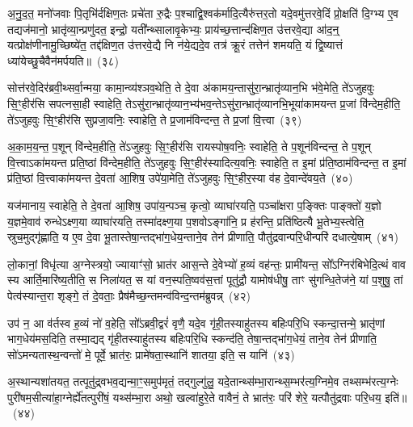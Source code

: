 अ॒नु॒द॒त॒ मनो॑जवाः पि॒तृभि॑र्दक्षिण॒तः प्रचे॑ता रु॒द्रैः प॒श्चाद्वि॒श्वक॑र्मादि॒त्यैरु॑त्तर॒तो यदे॒वमु॑त्तरवे॒दिं प्रो॒क्षति॑ दि॒ग्भ्य ए॒व तद्यज॑मानो॒ भ्रातृ॑व्या॒न्प्रणु॑दत॒ इन्द्रो॒ यती᳚न्थ्सालावृ॒केभ्यः॒ प्राय॑च्छ॒त्तान्द॑क्षिण॒त उ॑त्तरवे॒द्या आ॑द॒न्॒ यत्प्रोक्ष॑णीनामु॒च्छिष्ये॑त॒ तद्द॑क्षिण॒त उ॑त्तरवे॒द्यै नि न॑ये॒द्यदे॒व तत्र॑ क्रू॒रं तत्तेन॑ शमयति॒ यं द्वि॒ष्यात्तं ध्या॑येच्छु॒चैवैन॑मर्पयति॥~(३८)\ip

{\anuvakamend[{मि॒मी॒ते॒ नाम॑ ध्रु॒वा\-ऽप॑ शु॒चा त्रीणि॑ च}]}

सोत्त॑रवे॒दिर॑ब्रवी॒थ्सर्वा॒न्मया॒ कामा॒न्व्य॑श्ञव॒थेति॒ ते दे॒वा अ॑कामय॒न्तासु॑रा॒न्भ्रातृ॑व्यान॒भि भ॑वे॒मेति॒ ते॑\-ऽजुहवुः सि॒ꣳ॒हीर॑सि सपत्नसा॒ही स्वाहेति॒ ते\-ऽसु॑रा॒न्भ्रातृ॑व्यान॒भ्य॑भव॒न्ते\-ऽसु॑रा॒न्भ्रातृ॑व्यानभि॒भूया॑कामयन्त प्र॒जां वि॑न्देम॒हीति॒ ते॑\-ऽजुहवुः सि॒ꣳ॒हीर॑सि सुप्रजा॒वनिः॒ स्वाहेति॒ ते प्र॒जाम॑विन्दन्त॒ ते प्र॒जां वि॒त्त्वा~(३९)\ip

अ॒का॒म॒य॒न्त॒ प॒शून् वि॑न्देम॒हीति॒ ते॑\-ऽजुहवुः सि॒ꣳ॒हीर॑सि रायस्पोष॒वनिः॒ स्वाहेति॒ ते प॒शून॑विन्दन्त॒ ते प॒शून् वि॒त्त्वा\-ऽका॑मयन्त प्रति॒ष्ठां वि॑न्देम॒हीति॒ ते॑\-ऽजुहवुः सि॒ꣳ॒हीर॑स्यादित्य॒वनिः॒ स्वाहेति॒ त इ॒मां प्र॑ति॒ष्ठाम॑विन्दन्त॒ त इ॒मां प्र॑ति॒ष्ठां वि॒त्त्वाका॑मयन्त दे॒वता॑ आ॒शिष॒ उपे॑या॒मेति॒ ते॑\-ऽजुहवुः सि॒ꣳ॒हीर॒स्या व॑ह दे॒वान्दे॑वय॒ते~(४०)\ip

यज॑मानाय॒ स्वाहेति॒ ते दे॒वता॑ आ॒शिष॒ उपा॑य॒न्पञ्च॒ कृत्वो॒ व्याघा॑रयति॒ पञ्चा᳚क्षरा प॒ङ्क्तिः पाङ्क्तो॑ य॒ज्ञो य॒ज्ञमे॒वाव॑ रुन्धे\-ऽक्ष्ण॒या व्याघा॑रयति॒ तस्मा॑दक्ष्ण॒या प॒शवो\-ऽङ्गा॑नि॒ प्र ह॑रन्ति॒ प्रति॑ष्ठित्यै भू॒तेभ्य॒स्त्वेति॒ स्रुच॒मुद्गृ॑ह्णाति॒ य ए॒व दे॒वा भू॒तास्तेषा॒न्तद्भा॑ग॒धेय॒न्ताने॒व तेन॑ प्रीणाति॒ पौतु॑द्रवान्परि॒धीन्परि॑ दधात्ये॒षाम्~(४१)\ip

लो॒कानां॒ विधृ॑त्या अ॒ग्नेस्त्रयो॒ ज्यायाꣳ॑सो॒ भ्रात॑र आस॒न्ते दे॒वेभ्यो॑ ह॒व्यं वह॑न्तः॒ प्रामी॑यन्त॒ सो᳚\-ऽग्निर॑बिभेदि॒त्थं वाव स्य आर्ति॒मारि॑ष्य॒तीति॒ स निला॑यत॒ स यां वन॒स्पति॒ष्वव॑स॒त्तां पूतु॑द्रौ॒ यामोष॑धीषु॒ ताꣳ सु॑गन्धि॒तेज॑ने॒ यां प॒शुषु॒ तां पेत्व॑स्यान्त॒रा शृङ्गे॒ तं दे॒वताः॒ प्रैष॑मैच्छ॒न्तमन्व॑विन्द॒न्तम॑ब्रुवन्न्~(४२)\ip

उप॑ न॒ आ व॑र्तस्व ह॒व्यं नो॑ व॒हेति॒ सो᳚\-ऽब्रवी॒द्वरं॑ वृणै॒ यदे॒व गृ॑ही॒तस्याहु॑तस्य बहिःपरि॒धि स्कन्दा॒त्तन्मे॒ भ्रातृ॑णां भाग॒\-धेय॑मस॒दिति॒ तस्मा॒द्यद् गृ॑ही॒तस्याहु॑तस्य बहिःपरि॒धि स्कन्द॑ति॒ तेषा॒न्तद्भा॑ग॒धेयं॒ ताने॒व तेन॑ प्रीणाति॒ सो॑\-ऽमन्यतास्थ॒न्वन्तो॑ मे॒ पूर्वे॒ भ्रात॑रः॒ प्रामे॑षता॒स्थानि॑ शातया॒ इति॒ स यानि॑~(४३)\ip

अ॒स्थान्यशा॑तयत॒ तत्पूतु॑द्र्वभव॒द्यन्मा॒ꣳ॒समुप॑मृतं॒ तद्गुल्गु॑लु॒ यदे॒तान्थ्स॑म्भा॒रान्थ्स॒म्भर॑त्य॒ग्निमे॒व तथ्सम्भ॑रत्य॒ग्नेः पुरी॑षम॒सीत्या॑हा॒ग्नेर्\mbox{}ह्ये॑तत्पुरी॑षं॒ यथ्स॑म्भा॒रा अथो॒ खल्वा॑हुरे॒ते वावैनं॒ ते भ्रात॑रः॒ परि॑ शेरे॒ यत्पौतु॑द्रवाः परि॒धय॒ इति॑॥~(४४)\ip

